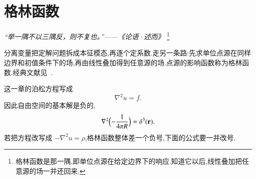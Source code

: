 \chapter{格林函数}
\label{ch:green}

\begin{flushright}
\textit{“举一隅不以三隅反，则不复也。”——《论语·述而》}
\footnote{格林函数是那一隅,即单位点源在给定边界下的响应.知道它以后,线性叠加把任意源的场一并还回来.}
\end{flushright}

分离变量把定解问题拆成本征模态,再逐个定系数.走另一条路:先求单位点源在同样边界和初值条件下的场,再由线性叠加得到任意源的场.点源的影响函数称为格林函数.经典文献见~\cite{green1828,duffy,stakgold,jackson}.

这一章的泊松方程写成
\begin{equation}
  \nabla^2 u=f.
  \label{eq:gf-poisson-sign}
\end{equation}
因此自由空间的基本解是负的,
\begin{equation}
  \nabla^2\Bigl(-\frac{1}{4\pi R}\Bigr)=\delta^3({\mathbf{r}}).
\end{equation}
若把方程改写成 $-\nabla^2 u=\rho$,格林函数整体差一个负号,下面的公式要一并改号.






